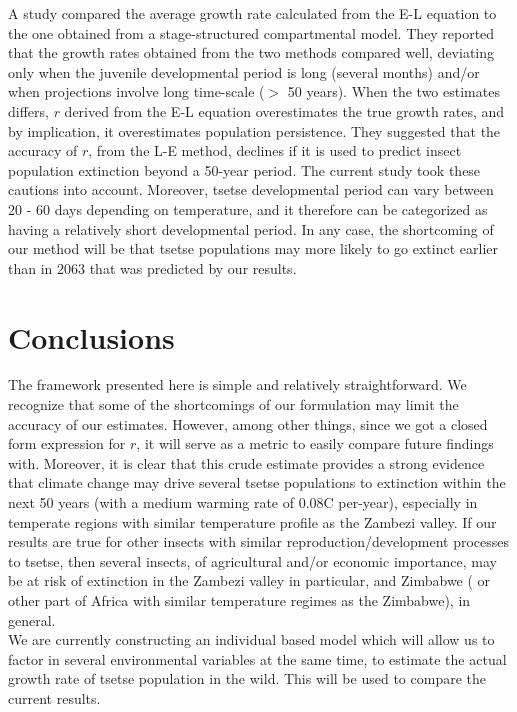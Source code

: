 \documentclass[10pt,a4paper]{article}
\begin{document}
A study \cite{Amarasekare2013} compared the average growth rate calculated from the E-L equation to the one obtained from a stage-structured compartmental model. They reported that the growth rates obtained from the two methods compared well, deviating only when the juvenile developmental period is long (several months) and/or when projections involve long time-scale ($>$ 50 years).  When the two estimates differs, $r$ derived from the E-L equation overestimates the true growth rates, and by implication, it overestimates population persistence. They suggested that the accuracy of $r$, from the L-E method, declines if it is used to predict insect population extinction beyond a 50-year period.  The current study took these cautions into account.  Moreover, tsetse developmental period can vary between 20 - 60 days depending on temperature, and it therefore can be categorized as having a relatively  short developmental period.   In any case, the shortcoming of our method will be that tsetse populations may more likely to go extinct earlier than in 2063 that was predicted by our results. 


\section*{Conclusions}
The framework presented here is simple and relatively straightforward. We recognize that some of the shortcomings of our formulation may limit the accuracy of our estimates.  However, among other things, since we got a closed form expression for $r$, it will serve as a metric to easily compare future findings with. Moreover,  it is clear that this crude estimate provides a strong evidence that climate change may drive several tsetse populations to extinction within the next 50 years (with a medium warming rate of 0.08\degree C per-year), especially in temperate regions with similar temperature profile as  the Zambezi valley. If our results are true for other insects with similar reproduction/development processes to tsetse, then several insects, of agricultural and/or economic importance, may be at risk of extinction in the Zambezi valley in particular, and Zimbabwe ( or other part of Africa with similar temperature regimes as the Zimbabwe),  in general. \\

We are currently constructing an individual based model which will allow us to factor in several environmental variables at the same time, to estimate the actual growth rate of tsetse population in the wild. This will be used to compare the current results. 


\nocite{*}

\end{document}
